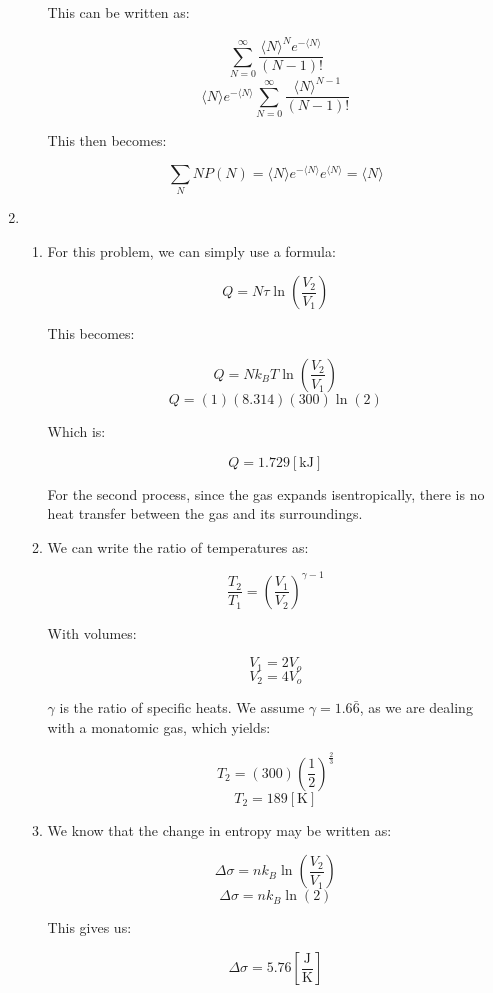 \begin{enumerate}
\begin{enumerate}
        This can be written as:

        $$\sum_{N=0}^\infty\frac{\langle N\rangle^Ne^{-\langle N\rangle}}{(N-1)!}$$
        $$\langle N\rangle e^{-\langle N\rangle}\sum_{N=0}^\infty\frac{\langle N\rangle^{N-1}}{(N-1)!}$$

        This then becomes:

        $$\boxed{\sum_N NP(N)=\langle N\rangle e^{-\langle N\rangle}e^{\langle N\rangle}=\langle N\rangle}$$

    \end{enumerate}

  \item

    \begin{enumerate}

      \item 

        For this problem, we can simply use a formula:

        $$Q=N\tau\ln\left( \frac{V_2}{V_1} \right)$$

        This becomes:

        $$Q=Nk_BT\ln\left( \frac{V_2}{V_1} \right)$$
        $$Q=(1)(8.314)(300)\ln(2)$$

        Which is:

        $$\boxed{Q=1.729[\si{\kilo\joule}]}$$

        For the second process, since the gas expands isentropically, there is no heat transfer between the gas and its surroundings.

      \item 

        We can write the ratio of temperatures as:

        $$\frac{T_2}{T_1}=\left( \frac{V_1}{V_2} \right)^{\gamma-1}$$

        With volumes:

        $$V_1=2V_o$$
        $$V_2=4V_o$$

        $\gamma$ is the ratio of specific heats. We assume $\gamma=1.6\bar{6}$, as we are dealing with a monatomic gas, which yields:

        $$T_2=(300)\left( \frac{1}{2} \right)^{\frac{2}{3}}$$
        $$\boxed{T_2=189[\si{\kelvin}]}$$

      \item 

        We know that the change in entropy may be written as:

        $$\Delta\sigma=nk_B\ln\left( \frac{V_2}{V_1} \right)$$
        $$\Delta\sigma=nk_B\ln(2)$$

        This gives us:

        $$\boxed{\Delta\sigma=5.76\left[ \frac{\si{\joule}}{\si{\kelvin}} \right]}$$

    \end{enumerate}

\end{enumerate}



